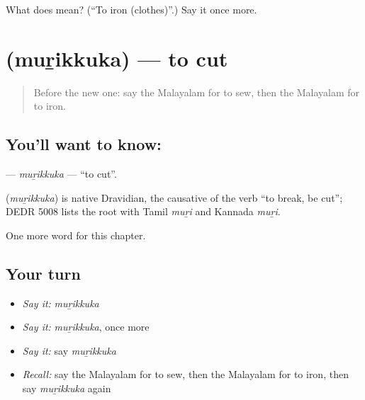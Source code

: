 \begin{tcolorbox}[breakable,colback=teal!4,colframe=teal!35!black,title={Before you move on}]
What does  mean? (\textquotedblleft{}To iron (clothes)\textquotedblright{}.) Say it once more.
\end{tcolorbox}
\section[\texorpdfstring{\ml{മുറിക്കുക} (muṟikkuka)}{മുറിക്കുക (muṟikkuka)}]{ (muṟikkuka) — to cut}

\label{lesson:ML-C302-murikkuka}



\begin{quote}
Before the new one: say the Malayalam for to sew, then the Malayalam for to iron.
\end{quote}

\subsection*{You'll want to know: }
\textbf{} — \emph{muṟikkuka} — \textquotedblleft{}to cut\textquotedblright{}.

\begin{cousinweb}
\textbf{} (\emph{muṟikkuka}) is native Dravidian, the causative of the verb \textquotedblleft{}to break, be cut\textquotedblright{}; DEDR 5008 lists the root with Tamil \emph{muṟi} and Kannada \emph{muṟi}.
\end{cousinweb}

\begin{grammarlens}[title={What you've built}]
One more word for this chapter.
\end{grammarlens}

\subsection*{Your turn}
\begin{itemize}
\raggedright
  \item \emph{Say it:} \emph{muṟikkuka}
  \item \emph{Say it:} \emph{muṟikkuka}, once more
  \item \emph{Say it:} say \emph{muṟikkuka}
  \item \emph{Recall:} say the Malayalam for to sew, then the Malayalam for to iron, then say \emph{muṟikkuka} again
\end{itemize}

